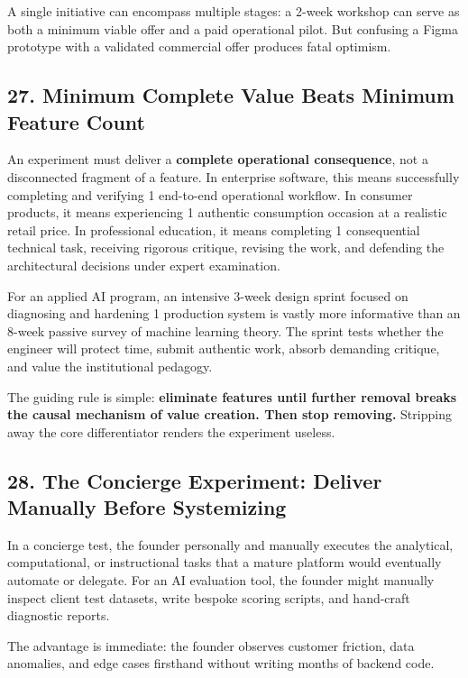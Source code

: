 A single initiative can encompass multiple stages: a 2-week workshop can serve as both a minimum viable offer and a paid operational pilot. But confusing a Figma prototype with a validated commercial offer produces fatal optimism.

\subsection*{27. Minimum Complete Value Beats Minimum Feature Count}

An experiment must deliver a \textbf{complete operational consequence}, not a disconnected fragment of a feature. In enterprise software, this means successfully completing and verifying 1 end-to-end operational workflow. In consumer products, it means experiencing 1 authentic consumption occasion at a realistic retail price. In professional education, it means completing 1 consequential technical task, receiving rigorous critique, revising the work, and defending the architectural decisions under expert examination.

For an applied AI program, an intensive 3-week design sprint focused on diagnosing and hardening 1 production system is vastly more informative than an 8-week passive survey of machine learning theory. The sprint tests whether the engineer will protect time, submit authentic work, absorb demanding critique, and value the institutional pedagogy.

The guiding rule is simple: \textbf{eliminate features until further removal breaks the causal mechanism of value creation. Then stop removing.} Stripping away the core differentiator renders the experiment useless.

\subsection*{28. The Concierge Experiment: Deliver Manually Before Systemizing}

In a concierge test, the founder personally and manually executes the analytical, computational, or instructional tasks that a mature platform would eventually automate or delegate. For an AI evaluation tool, the founder might manually inspect client test datasets, write bespoke scoring scripts, and hand-craft diagnostic reports.

The advantage is immediate: the founder observes customer friction, data anomalies, and edge cases firsthand without writing months of backend code.

